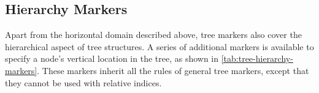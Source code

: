 \documentclass[11pt,a4paper]{report}
\begin{document}
\subsection{Hierarchy Markers}
\label{sec:hierarchy-markers}
Apart from the horizontal domain described above, tree markers also cover the hierarchical aspect of tree structures.
A series of additional markers is available to specify a node's vertical location in the tree, as shown in \cref{tab:tree-hierarchy-markers}.
These markers inherit all the rules of general tree markers, except that they cannot be used with relative indices.%
\end{document}
